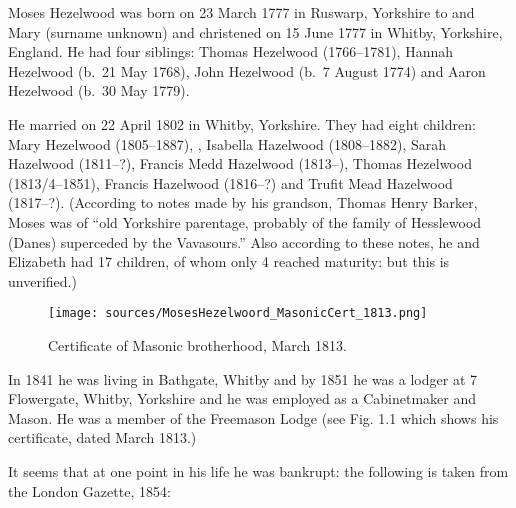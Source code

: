 
Moses Hezelwood was born on 23 March 1777 in Ruswarp, Yorkshire to  and Mary (surname unknown) and christened on 15 June 1777 in Whitby, Yorkshire, England.\cite{MHezelwoodBirth} He had four siblings: Thomas Hezelwood (1766--1781), Hannah Hezelwood (b.\ 21 May 1768), John Hezelwood (b.\ 7 August 1774) and Aaron Hezelwood (b.\ 30 May 1779).

He married  on 22 April 1802 in	Whitby, Yorkshire.\cite{MHezelwoodMarriage}  They had eight children: Mary Hezelwood (1805--1887), , Isabella Hazelwood (1808--1882), Sarah Hazelwood (1811--?), Francis Medd Hazelwood (1813--), Thomas Hezelwood (1813/4--1851), Francis Hazelwood (1816--?) and Trufit Mead Hazelwood (1817--?). (According to notes made by his grandson, Thomas Henry Barker, Moses  was of ``old Yorkshire parentage, probably of the family of Hesslewood (Danes) superceded by the Vavasours.'' Also according to these notes, he and Elizabeth had 17 children, of whom only 4 reached maturity: but this is unverified.)

\begin{figure}
 \centering
 \texttt{[image: sources/MosesHezelwoord\_MasonicCert\_1813.png]}
 \caption{Certificate of Masonic brotherhood, March 1813.}
\end{figure}

In 1841 he was living in Bathgate, Whitby \cite{MHezelwood1841} and by 1851 he was a lodger at 7 Flowergate, Whitby, Yorkshire and he was employed as a Cabinetmaker and Mason.\cite{MHezelwood1851}  He was a member of the Freemason Lodge (see Fig. 1.1 which shows his certificate, dated March 1813.)

It seems that at one point in his life he was bankrupt: the following is taken from the London Gazette, 1854:\cite{MHezelwoodBankruptcy}

